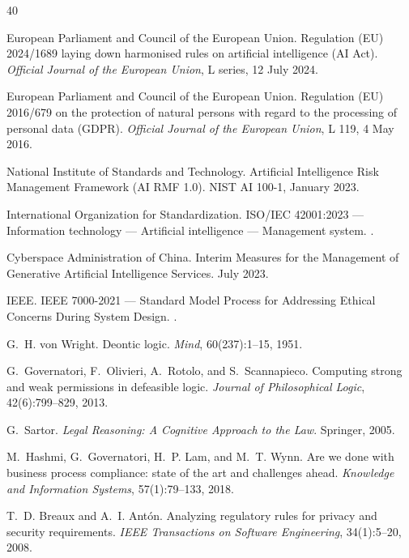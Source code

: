 \documentclass[11pt,twocolumn]{article}
\begin{document}
\begin{thebibliography}{40}

European Parliament and Council of the European Union.
\newblock Regulation (EU) 2024/1689 laying down harmonised rules on artificial
  intelligence (AI Act).
\newblock \emph{Official Journal of the European Union}, L series, 12 July 2024.

European Parliament and Council of the European Union.
\newblock Regulation (EU) 2016/679 on the protection of natural persons with
  regard to the processing of personal data (GDPR).
\newblock \emph{Official Journal of the European Union}, L 119, 4 May 2016.

National Institute of Standards and Technology.
\newblock Artificial Intelligence Risk Management Framework (AI RMF 1.0).
\newblock NIST AI 100-1, January 2023.

International Organization for Standardization.
\newblock ISO/IEC 42001:2023 --- Information technology --- Artificial
  intelligence --- Management system.
.

Cyberspace Administration of China.
\newblock Interim Measures for the Management of Generative Artificial
  Intelligence Services.
\newblock July 2023.

IEEE.
\newblock IEEE 7000-2021 --- Standard Model Process for Addressing Ethical
  Concerns During System Design.
.

G.~H. von Wright.
\newblock Deontic logic.
\newblock \emph{Mind}, 60(237):1--15, 1951.

G.~Governatori, F.~Olivieri, A.~Rotolo, and S.~Scannapieco.
\newblock Computing strong and weak permissions in defeasible logic.
\newblock \emph{Journal of Philosophical Logic}, 42(6):799--829, 2013.

G.~Sartor.
\newblock \emph{Legal Reasoning: A Cognitive Approach to the Law}.
\newblock Springer, 2005.

M.~Hashmi, G.~Governatori, H.~P. Lam, and M.~T. Wynn.
\newblock Are we done with business process compliance: state of the art and
  challenges ahead.
\newblock \emph{Knowledge and Information Systems}, 57(1):79--133, 2018.

T.~D. Breaux and A.~I. Ant{\'o}n.
\newblock Analyzing regulatory rules for privacy and security requirements.
\newblock \emph{IEEE Transactions on Software Engineering}, 34(1):5--20, 2008.


\end{thebibliography}
\end{document}
